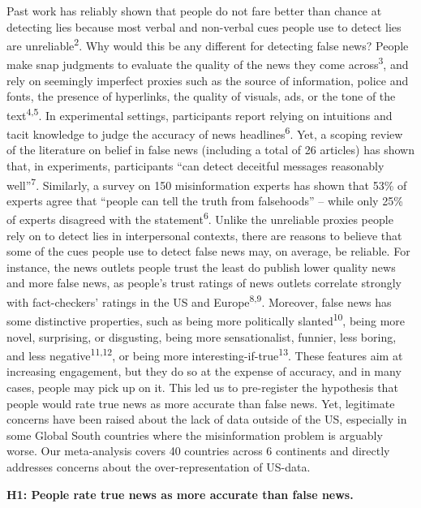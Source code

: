\documentclass[
  man]{apa6}
\begin{document}
Past work has reliably shown that people do not fare better than chance at detecting lies because most verbal and non-verbal cues people use to detect lies are unreliable\textsuperscript{2}. Why would this be any different for detecting false news? People make snap judgments to evaluate the quality of the news they come across\textsuperscript{3}, and rely on seemingly imperfect proxies such as the source of information, police and fonts, the presence of hyperlinks, the quality of visuals, ads, or the tone of the text\textsuperscript{4,5}. In experimental settings, participants report relying on intuitions and tacit knowledge to judge the accuracy of news headlines\textsuperscript{6}. Yet, a scoping review of the literature on belief in false news (including a total of 26 articles) has shown that, in experiments, participants ``can detect deceitful messages reasonably well''\textsuperscript{7}. Similarly, a survey on 150 misinformation experts has shown that 53\% of experts agree that ``people can tell the truth from falsehoods'' -- while only 25\% of experts disagreed with the statement\textsuperscript{6}. Unlike the unreliable proxies people rely on to detect lies in interpersonal contexts, there are reasons to believe that some of the cues people use to detect false news may, on average, be reliable. For instance, the news outlets people trust the least do publish lower quality news and more false news, as people's trust ratings of news outlets correlate strongly with fact-checkers' ratings in the US and Europe\textsuperscript{8,9}. Moreover, false news has some distinctive properties, such as being more politically slanted\textsuperscript{10}, being more novel, surprising, or disgusting, being more sensationalist, funnier, less boring, and less negative\textsuperscript{11,12}, or being more interesting-if-true\textsuperscript{13}. These features aim at increasing engagement, but they do so at the expense of accuracy, and in many cases, people may pick up on it. This led us to pre-register the hypothesis that people would rate true news as more accurate than false news. Yet, legitimate concerns have been raised about the lack of data outside of the US, especially in some Global South countries where the misinformation problem is arguably worse. Our meta-analysis covers 40 countries across 6 continents and directly addresses concerns about the over-representation of US-data.

\textbf{H1: People rate true news as more accurate than false news.}
\end{document}
